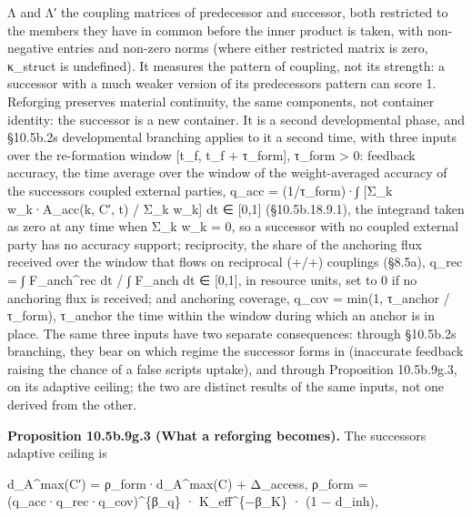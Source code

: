 \documentclass[
]{article}
\begin{document}
Λ and Λ′ the coupling matrices of predecessor and successor, both
restricted to the members they have in common before the inner product
is taken, with non-negative entries and non-zero norms (where either
restricted matrix is zero, κ\_struct is undefined). It measures the
pattern of coupling, not its strength: a successor with a much weaker
version of its predecessor\textquotesingle s pattern can score 1.
Reforging preserves material continuity, the same components, not
container identity: the successor is a new container. It is a second
developmental phase, and §10.5b.2\textquotesingle s developmental
branching applies to it a second time, with three inputs over the
re-formation window {[}t\_f, t\_f + τ\_form{]}, τ\_form \textgreater{}
0: feedback accuracy, the time average over the window of the
weight-averaged accuracy of the successor\textquotesingle s coupled
external parties, q\_acc = (1/τ\_form)·∫ {[}Σ\_k w\_k·A\_acc(k, C′, t) /
Σ\_k w\_k{]} dt ∈ {[}0,1{]} (§10.5b.18.9.1), the integrand taken as zero
at any time when Σ\_k w\_k = 0, so a successor with no coupled external
party has no accuracy support; reciprocity, the share of the anchoring
flux received over the window that flows on reciprocal (+/+) couplings
(§8.5a), q\_rec = ∫ F\_anch\^{}rec dt / ∫ F\_anch dt ∈ {[}0,1{]}, in
resource units, set to 0 if no anchoring flux is received; and anchoring
coverage, q\_cov = min(1, τ\_anchor / τ\_form), τ\_anchor the time
within the window during which an anchor is in place. The same three
inputs have two separate consequences: through
§10.5b.2\textquotesingle s branching, they bear on which regime the
successor forms in (inaccurate feedback raising the chance of a false
script\textquotesingle s uptake), and through Proposition 10.5b.9g.3, on
its adaptive ceiling; the two are distinct results of the same inputs,
not one derived from the other.

\textbf{Proposition 10.5b.9g.3 (What a reforging becomes).} The
successor\textquotesingle s adaptive ceiling is

d\_A\^{}max(C′) = ρ\_form·d\_A\^{}max(C) + Δ\_access, ρ\_form =
(q\_acc·q\_rec·q\_cov)\^{}\{β\_q\} · K\_eff\^{}\{−β\_K\} · (1 − d\_inh),
\end{document}
